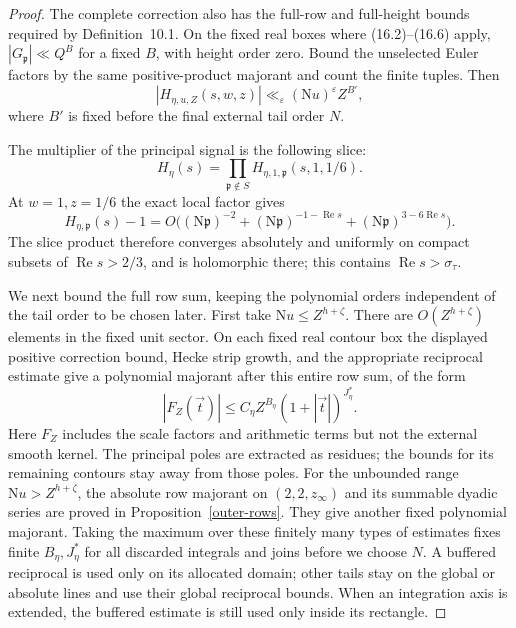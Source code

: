 \documentclass[10pt,reqno,a4paper]{amsart}
\theoremstyle{remark}
\newcommand{\N}{\mathrm N}
\newcommand{\Rea}{\operatorname{Re}}
\newcommand{\eps}{\varepsilon}
\newcommand{\pp}{\mathfrak p}
\newcommand{\st}{\sigma_\tau}
\begin{document}
\begin{proof}
The complete correction also has the full-row and full-height
bounds required by Definition~10.1. On the fixed real boxes where
(16.2)--(16.6) apply, $|G_\pp|\ll Q^B$ for a fixed $B$, with
height order zero. Bound the unselected Euler factors by the same
positive-product majorant and count the finite tuples. Then
\[
           |H_{\eta,u,Z}(s,w,z)|
                \ll_\eps(\N u)^\eps Z^{B'},
\]
where $B'$ is fixed before the final external tail order $N$.

The multiplier of the principal signal is the following slice:
\[
 H_\eta(s)=\prod_{\pp\notin S}
                   H_{\eta,1,\pp}(s,1,1/6).
\]
At $w=1,z=1/6$ the exact local factor gives
\[
 H_{\eta,\pp}(s)-1
   =O\bigl((\N\pp)^{-2}
        +(\N\pp)^{-1-\Rea s}
        +(\N\pp)^{3-6\Rea s}\bigr).
\]
The slice product therefore converges absolutely and uniformly
on compact subsets of $\Rea s>2/3$, and is holomorphic there; this
contains $\Rea s>\st$.

We next bound the full row sum, keeping the polynomial orders
independent of the tail order to be chosen later. First take
$\N u\le Z^{h+\zeta}$. There are $O(Z^{h+\zeta})$ elements in
the fixed unit sector. On each fixed real contour box the displayed
positive correction bound, Hecke strip growth, and the appropriate
reciprocal estimate give a polynomial majorant after this entire row
sum, of the form
\[
                 |F_Z(\vec{t})|
                 \le C_\eta Z^{B_\eta}(1+|\vec{t}|)^{J_\eta^*}.
\]
Here $F_Z$ includes the scale factors and arithmetic terms but not
the external smooth kernel. The principal poles are extracted as
residues; the bounds for its remaining contours stay away from those
poles. For the unbounded range $\N u>Z^{h+\zeta}$, the absolute
row majorant on $(2,2,z_\infty)$ and its summable dyadic series are
proved in Proposition~\ref{outer-rows}. They give another fixed
polynomial majorant. Taking the maximum over these finitely many types of estimates fixes
finite $B_\eta,J_\eta^*$ for all discarded integrals and joins before
we choose $N$.
A buffered reciprocal is used only on its allocated domain; other
tails stay on the global or absolute lines and use their global
reciprocal bounds. When an integration axis is extended, the buffered estimate is still
used only inside its rectangle.


\end{proof}
\end{document}
